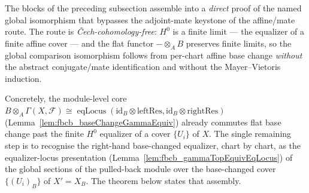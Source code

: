 The blocks of the preceding subsection assemble into a \emph{direct} proof of the named global
isomorphism that bypasses the adjoint-mate keystone of the affine/mate route. The route is
\emph{{\v C}ech-cohomology-free}: \(H^0\) is a finite limit — the equalizer of a finite affine cover —
and the flat functor \(-\otimes_A B\) preserves finite limits, so the global comparison isomorphism
follows from per-chart affine base change \emph{without} the abstract conjugate/mate identification and
without the Mayer--Vietoris induction.

Concretely, the module-level core
\(B \otimes_A \Gamma(X,\mathcal{F}) \cong \operatorname{eqLocus}(\mathrm{id}_B\otimes\mathrm{leftRes},
\mathrm{id}_B\otimes\mathrm{rightRes})\) (Lemma~\ref{lem:fbcb_baseChangeGammaEquiv}) already commutes flat
base change past the finite \(H^0\) equalizer of a cover \(\{U_i\}\) of \(X\). The single remaining step
is to recognise the right-hand base-changed equalizer, chart by chart, as the equalizer-locus
presentation (Lemma~\ref{lem:fbcb_gammaTopEquivEqLocus}) of the global sections of the pulled-back module
over the base-changed cover \(\{(U_i)_B\}\) of \(X' = X_B\). The theorem below states that assembly.


